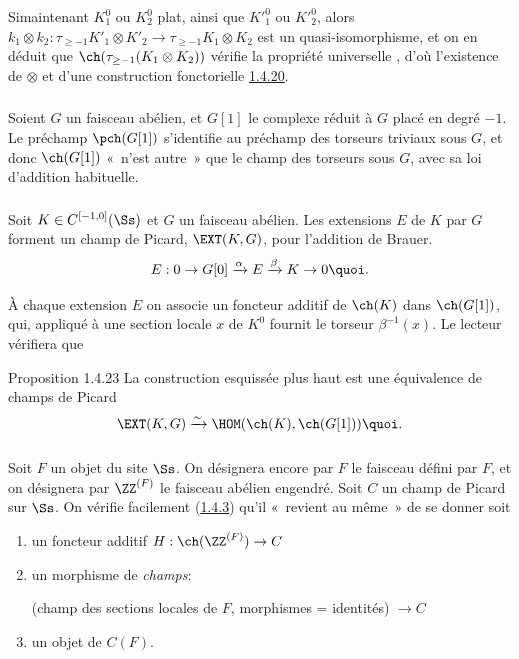 Si\pageoriginale maintenant $K^0_{1}$ ou $K^0_{2}$ plat,
ainsi que ${K'}^0_{1}$ ou ${K'}^0_{2}$, alors
$k_{1}\otimes k_{2}:\tau_{\geq -1}{K'}_{1}\otimes {K'}_{2}\rightarrow
\tau_{\geq -1}K_{1}\otimes K_{2}$ est un quasi-isomorphisme, et on en
déduit que $\ch(\tau_{\geq -1}(K_{1}\otimes K_{2}))$ vérifie la
propriété universelle , d'où l'existence de $\otimes$ et
d'une construction fonctorielle \hyperref[XVIII.const1.4.20]{1.4.20}. 

\setcounter{subsubsection}{20}
\subsubsection{}
Soient $G$ un faisceau
abélien, et $G[1]$ le complexe réduit à $G$ placé en degré $-1$. Le
préchamp $\pch(G[1])$ s'identifie au préchamp des torseurs triviaux
sous $G$, et donc $\ch(G[1])$ « n'est autre »  que le champ des
torseurs sous $G$, avec sa loi d'addition habituelle.

\subsubsection{}
Soit $K\in C^{[-1,0]}(\Ss)$ et $G$ un faisceau abélien. Les
extensions $E$ de $K$ par $G$ forment un champ de Picard, $\EXT(K,G)$,
pour l'addition de Brauer.
$$
E:0\rightarrow
G[0]\xrightarrow{\alpha}E\xrightarrow{\beta}K\rightarrow 0{\quoi}.
$$

À chaque extension $E$ on associe un foncteur additif de $\ch(K)$ dans
$\ch(G[1])$, qui, appliqué à une section locale $x$ de $K^{0}$ fournit
le torseur $\beta^{-1}(x)$. Le lecteur vérifiera que

\begin{enonce*}{Proposition 1.4.23}
La construction esquissée plus haut est une équivalence de champs de
Picard
$$
\EXT(K,G)\xrightarrow{\sim} \HOM(\ch(K),\ch(G[1])){\quoi}.
$$
\end{enonce*}

\setcounter{subsubsection}{23}
\subsubsection{}
Soit $F$ un objet du site $\Ss$. On désignera encore par $F$
le faisceau défini par $F$, et on désignera par $\ZZ^{(F)}$ le
faisceau abélien engendré. Soit $C$ un champ de Picard sur
$\Ss$. On vérifie facilement (\cf \hyperref[XVIII.lem1.4.3]{1.4.3}) qu'il « revient au même »  de se donner soit
\begin{enumerate}
\renewcommand{\theenumi}{\alph{enumi}}
\renewcommand{\labelenumi}{\theenumi)}
\item un foncteur additif $H:\ch(\ZZ^{(F)})\rightarrow C$

\item un morphisme de \emph{champs}:

(champ des sections locales de $F$, morphismes = identités)
$\rightarrow C$

\item un objet de $C(F)$.
\end{enumerate}

